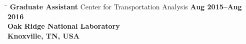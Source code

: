 \documentclass[margin,line]{resume}
\begin{document}
\begin{resume}

    
     \begin{tabbing}
   \hspace{2.0in}\= \hspace{2.6in}\= \kill %
    {\bf Graduate Assistant} \> Center for Transportation Analysis \> \bf  Aug 2015--Aug 2016\\
                    \>  \bf Oak Ridge National Laboratory   \\   \> Knoxville, TN, USA
   \end{tabbing}\vspace{-20pt}



\end{resume}
\end{document}
